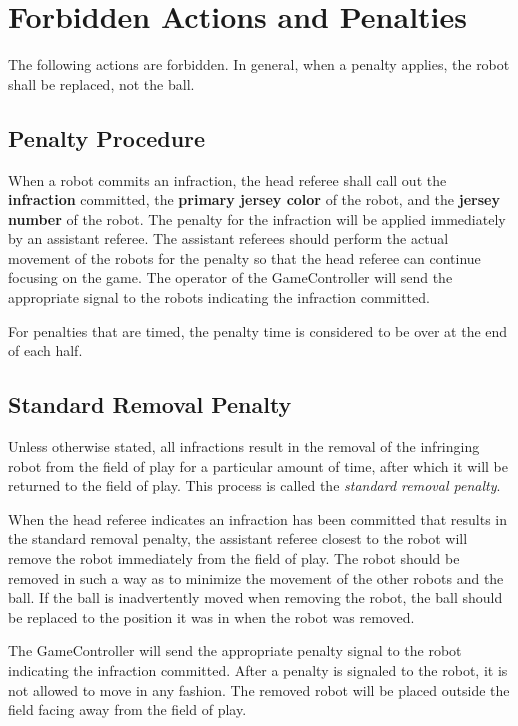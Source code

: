 \section{Forbidden Actions and Penalties}
\label{sec:forbidden_act}

The following actions are forbidden. In general, when a penalty applies, the robot shall be replaced, not the ball.

\subsection{Penalty Procedure}
\label{sec:penalty_procedure}

When a robot commits an infraction, the head referee shall call out the \textbf{infraction} committed, the \textbf{primary jersey color} of the robot, and the \textbf{jersey number} of the robot. The penalty for the infraction will be applied immediately by an assistant referee. The assistant referees should perform the actual movement of the robots for the penalty so that the head referee can continue focusing on the game. The operator of the GameController will send the appropriate signal to the robots indicating the infraction committed.

For penalties that are timed, the penalty time is considered to be over at the end of each half.

\subsection{Standard Removal Penalty}
\label{sec:removal_penalty}

Unless otherwise stated, all infractions result in the removal of the infringing robot from the field of play for a particular amount of time, after which it will be returned to the field of play. This process is called the \textit{standard removal penalty}.

When the head referee indicates an infraction has been committed that results in the standard removal penalty, the assistant referee closest to the robot will remove the robot immediately from the field of play. The robot should be removed in such a way as to minimize the movement of the other robots and the ball. If the ball is inadvertently moved when removing the robot, the ball should be replaced to the position it was in when the robot was removed.

The GameController will send the appropriate penalty signal to the robot indicating the infraction committed. After a penalty is signaled to the robot, it is not allowed to move in any fashion. The removed robot will be placed outside the field facing away from the field of play.

